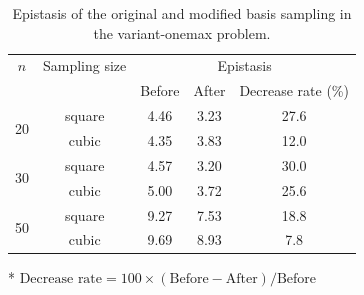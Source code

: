 \begin{table}[H]
	\caption{Epistasis of the original and modified basis sampling in the variant-onemax problem.} \label{tab:epi_var}
	\vspace*{0.2cm}
	\centering
	\begin{threeparttable}
		\begin{tabular}{ccccc}
		\toprule
		\multirow{2.5}{*}{$ n $} & \multirow{2.5}{*}{Sampling size} & \multicolumn{3}{c}{Epistasis} \\	\cmidrule(lr){3-5}
		& & Before & After & Decrease rate (\%)\tnote{*}       \\
		\midrule
		\multirow{2}{*}{20} & square	& 4.46 & 3.23 & 27.6   \\
							& cubic		& 4.35 & 3.83 & 12.0   \\
		\midrule
		\multirow{2}{*}{30} & square	& 4.57 & 3.20 & 30.0   \\
							& cubic		& 5.00 & 3.72 & 25.6   \\
		\midrule
		\multirow{2}{*}{50} & square	& 9.27 & 7.53 & 18.8   \\
							& cubic		& 9.69 & 8.93 & { 7.8} \\
		\bottomrule
		\end{tabular}
		\begin{tablenotes}
			\footnotesize
			\item[*] $ \text{Decrease rate} = 100 \times \left( \text{Before} - \text{After} \right) / \text{Before}$
		\end{tablenotes}
	\end{threeparttable}
\end{table}

